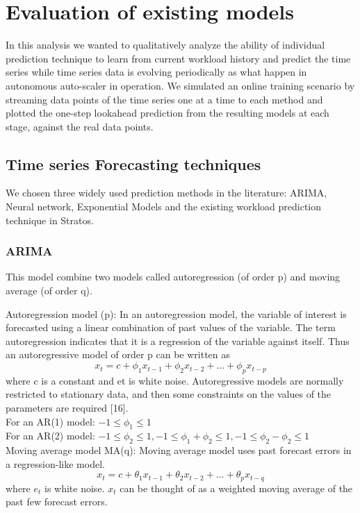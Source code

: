 \section{Evaluation of existing models}

In this analysis we wanted to qualitatively analyze the ability of individual prediction technique to learn from current workload history and predict the time series while time series data is evolving periodically as what happen in autonomous auto-scaler in operation. We simulated an online training scenario by streaming data points of the time series one at a time to each method and plotted the one-step lookahead prediction from the resulting models at each stage, against the real data points.

\subsection{Time series Forecasting techniques}
We chosen three widely used prediction methods in the literature: ARIMA, Neural network, Exponential Models and the existing workload prediction technique in Stratos.

\subsubsection{ARIMA}
This model combine two models called autoregression (of order p) and moving average (of order q).

Autoregression model (p): In an autoregression model, the variable of interest is forecasted using a linear combination of past values of the variable. The term autoregression indicates that it is a regression of the variable against itself. Thus an autoregressive model of order p can be written as
	$$x_{t} = c + \phi_{1}x_{t - 1} + \phi_{2}x_{t - 2} + ...+ \phi_{p}x_{t-p}$$
where c is a constant and et is white noise. Autoregressive models are normally restricted to stationary data, and then some constraints on the values of the parameters are required [16]. \\
For an AR(1) model: $-1 \leq  \phi_{1} \leq 1$ \\
For an AR(2) model: $-1 \leq  \phi_{2} \leq 1, -1 \leq  \phi_{1}+\phi_{2} \leq 1, -1 \leq  \phi_{2}-\phi_{2} \leq 1 $ \\

Moving average model MA(q): Moving average model uses past forecast errors in a regression-like model.
	$$	x_{t} = c + \theta _{1}x_{t - 1} + \theta _{2}x_{t - 2} + ...+ \theta _{p}x_{t-q}$$
where $e_t$ is white noise. $x_t$ can be thought of as a weighted moving average of the past few forecast errors. \\


